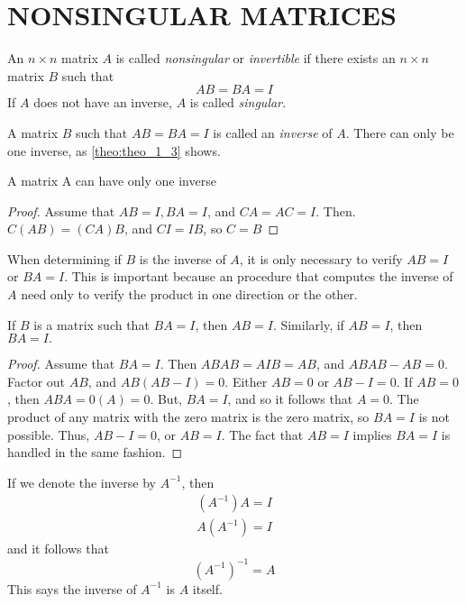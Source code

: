 \documentclass[../main.tex]{subfiles}
\begin{document}
\section[Nonsingular matrices]{NONSINGULAR MATRICES}
\label{sec:sec_1_4}

\begin{definition}
	\label{defn:defn_1_12}
	An $n \times n$ matrix $A$ is called \emph{nonsingular} or \emph{invertible} if there exists an $n \times n$ matrix $B$ such that
$$
A B=B A=I
$$
If $A$ does not have an inverse, $A$ is called \emph{singular.}
\end{definition}

A matrix $B$ such that $A B=B A=I$ is called an \emph{inverse} of $A .$ There can only be one inverse, as \autoref{theo:theo_1_3} shows.

\begin{theorem}
	\label{theo:theo_1_3}
	A matrix A can have only one inverse
\end{theorem}

\begin{proof}
	Assume that $A B=I, B A=I$, and $C A=A C=I .$ Then. $C(A B)=(C A) B$, and $C I=I B$, so $C=B$
\end{proof}

When determining if $B$ is the inverse of $A$, it is only necessary to verify $A B=I$ or $B A=I .$ This is important because an procedure that computes the inverse of $A$ need only to verify the product in one direction or the other.\\

\begin{theorem}
\label{theo:theo_1_4}
If $B$ is a matrix such that $B A=I$, then $A B=I .$ Similarly, if $A B=I$, then $B A=I .$
\end{theorem}

\begin{proof}
	Assume that $B A=I$. Then $A B A B=A I B=A B$, and $A B A B-A B=0 .$ Factor out $A B$, and $A B(A B-I)=0 .$ Either $A B=0$ or $A B-I=0 .$ If $A B=0$, then $A B A=0(A)=0 .$ But, $B A=I$, and so it follows that $A=0 .$ The product of any matrix with the zero matrix is the zero matrix, so $B A=I$ is not possible. Thus, $A B-I=0$, or $A B=I .$ The fact that $A B=I$ implies $B A=I$ is handled in the same fashion.
\end{proof}

If we denote the inverse by $A^{-1}$, then
$$
\begin{array}{l}
\left(A^{-1}\right) A=I \\
A\left(A^{-1}\right)=I
\end{array}
$$
and it follows that
$$
\left(A^{-1}\right)^{-1}=A
$$
This says the inverse of $A^{-1}$ is $A$ itself.
\end{document}
